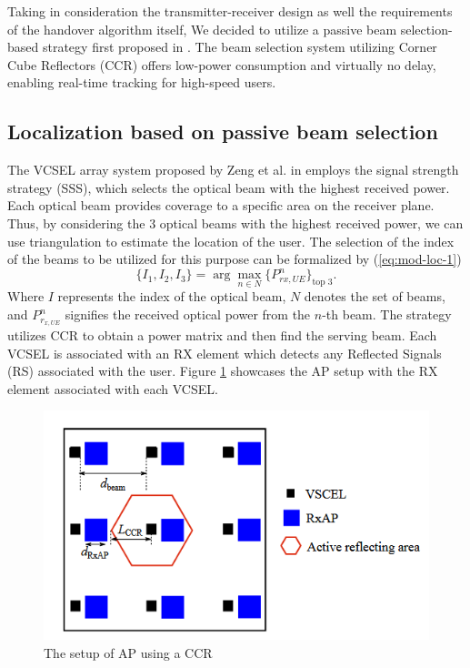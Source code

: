 Taking in consideration the transmitter-receiver design as well the requirements of the handover algorithm itself, We decided to utilize a passive beam selection-based strategy first proposed in \cite{zeng_vcsel_2022}. The beam selection system utilizing Corner Cube Reflectors (CCR) offers low-power consumption and virtually no delay, enabling real-time tracking for high-speed users.
\subsection{Localization based on passive beam selection}
\label{subsec:mod-loc-pas-beam}
The VCSEL array system proposed by Zeng et al. in \cite{zeng_vcsel_2022} employs the signal strength strategy (SSS), which selects the optical beam with the highest received power. Each optical beam provides coverage to a specific area on the receiver plane. Thus, by considering the 3 optical beams with the highest received power, we can use triangulation to estimate the location of the user. The selection of the index of the beams to be utilized for this purpose can be formalized by (\ref{eq:mod-loc-1})
\begin{equation}
    \{I_1, I_2, I_3\} = \arg \max_{n \in N} \{{P_{rx,UE}^n}\}_{\text{top 3}}.
    \label{eq:mod-loc-1}
\end{equation}
Where \(I\) represents the index of the optical beam, \(N\) denotes the set of beams, and \(P_{r_{x,UE}}^n\) signifies the received optical power from the \(n\)-th beam. The strategy utilizes CCR to obtain a power matrix and then find the serving beam. Each VCSEL is associated with an RX element which detects any Reflected Signals (RS) associated with the user. Figure \ref{fig:mod-loc-ap} showcases the AP setup with the RX element associated with each VCSEL.
\begin{figure}
    \centering
    \includegraphics[width=0.75\linewidth]{Figures/modeling-localization-ap-design.png}
    \caption{The setup of AP using a CCR\cite{zeng_vcsel_2022}}
    \label{fig:mod-loc-ap}
\end{figure}


